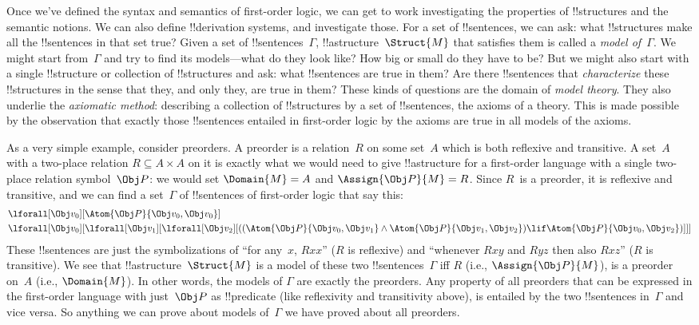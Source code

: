\documentclass[../../../include/open-logic-section]{subfiles}
\begin{document}

Once we've defined the syntax and semantics of first-order logic, we
can get to work investigating the properties of !!{structure}s and the
semantic notions. We can also define !!{derivation} systems, and
investigate those.  For a set of !!{sentence}s, we can ask: what
!!{structure}s make all the !!{sentence}s in that set true?  Given a
set of !!{sentence}s~$\Gamma$, !!a{structure}~$\Struct{M}$ that
satisfies them is called a \emph{model of~$\Gamma$}.  We might start
from~$\Gamma$ and try to find its models---what do they look like? How
big or small do they have to be? But we might also start with a single
!!{structure} or collection of !!{structure}s and ask: what
!!{sentence}s are true in them?  Are there !!{sentence}s that
\emph{characterize} these !!{structure}s in the sense that they, and
only they, are true in them? These kinds of questions are the domain
of \emph{model theory}.  They also underlie the \emph{axiomatic
  method}: describing a collection of !!{structure}s by a set of
!!{sentence}s, the axioms of a theory. This is made possible by the
observation that exactly those !!{sentence}s entailed in first-order
logic by the axioms are true in all models of the axioms.

As a very simple example, consider preorders. A preorder is a
relation~$R$ on some set~$A$ which is both reflexive and transitive.
A set~$A$ with a two-place relation $R \subseteq A \times A$ on it is
exactly what we would need to give !!a{structure} for a first-order
language with a single two-place relation symbol~$\Obj P$: we would
set $\Domain{M} = A$ and $\Assign{\Obj P}{M} = R$.  Since $R$~is a
preorder, it is reflexive and transitive, and we can find a
set~$\Gamma$ of !!{sentence}s of first-order logic that say this:
\begin{align*}
  & \lforall[\Obj v_0][\Atom{\Obj P}{\Obj v_0,\Obj v_0}]\\
  & \lforall[\Obj v_0][\lforall[\Obj v_1][\lforall[\Obj v_2][((\Atom{\Obj P}{\Obj v_0,\Obj v_1} \land \Atom{\Obj P}{\Obj v_1,\Obj v_2}) \lif \Atom{\Obj P}{\Obj v_0,\Obj v_2})]]]
\end{align*}
These !!{sentence}s are just the symbolizations of ``for any~$x$,
$Rxx$'' ($R$ is reflexive) and ``whenever $Rxy$ and $Ryz$ then also
$Rxz$'' ($R$ is transitive). We see that !!a{structure}~$\Struct{M}$
is a model of these two !!{sentence}s~$\Gamma$ iff $R$ (i.e.,
$\Assign{\Obj P}{M}$), is a preorder on~$A$ (i.e., $\Domain{M}$). In
other words, the models of $\Gamma$ are exactly the preorders. Any
property of all preorders that can be expressed in the first-order
language with just~$\Obj P$ as !!{predicate} (like reflexivity and
transitivity above), is entailed by the two !!{sentence}s in~$\Gamma$
and vice versa.  So anything we can prove about models of~$\Gamma$ we
have proved about all preorders.
\end{document}
